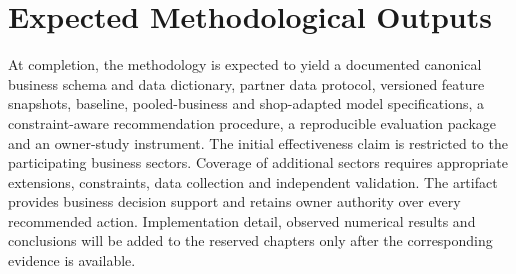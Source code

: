 \section{Expected Methodological Outputs}

At completion, the methodology is expected to yield a documented canonical
business schema and data dictionary, partner data protocol, versioned feature
snapshots, baseline, pooled-business and shop-adapted model specifications, a
constraint-aware recommendation procedure, a reproducible evaluation package
and an owner-study instrument. The initial effectiveness claim is restricted to
the participating business sectors. Coverage of additional sectors requires appropriate extensions, constraints,
data collection and independent validation. The
artifact provides business decision support and retains owner authority over every recommended action.
Implementation detail, observed numerical results and conclusions will be added
to the reserved chapters only after the corresponding evidence is available.
